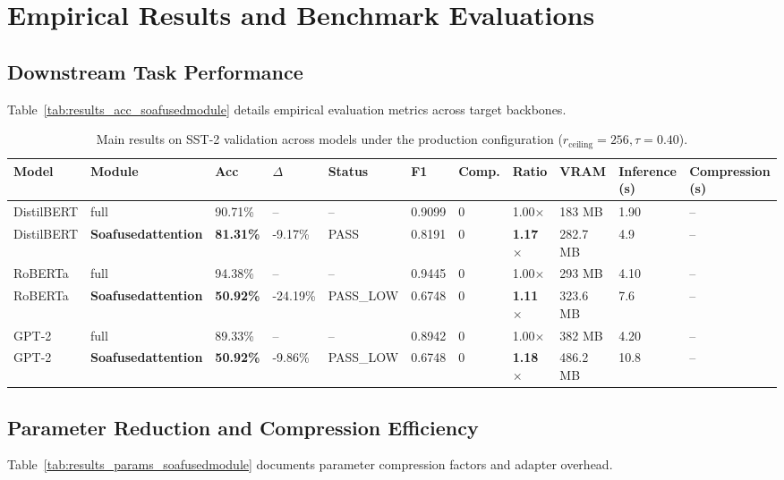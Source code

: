 \section{Empirical Results and Benchmark Evaluations}

\subsection{Downstream Task Performance}
Table~\ref{tab:results_acc_soafusedmodule} details empirical evaluation metrics across target backbones.

\begin{table}[t]
\centering
\small
\begin{tabular}{lllllllllll}
\toprule
\textbf{Model} & \textbf{Module} & \textbf{Acc} & \textbf{$\Delta$} & \textbf{Status} & \textbf{F1} & \textbf{Comp.} & \textbf{Ratio} & \textbf{VRAM} & \textbf{Inference (s)} & \textbf{Compression (s)} \\
\midrule
DistilBERT & full & 90.71\% & -- & -- & 0.9099 & 0 & 1.00$\times$ & 183 MB & 1.90 & -- \\
DistilBERT & \textbf{Soafusedattention} & \textbf{81.31\%} & -9.17\% & PASS & 0.8191 & 0 & \textbf{1.17$\times$} & 282.7 MB & 4.9 & -- \\
RoBERTa & full & 94.38\% & -- & -- & 0.9445 & 0 & 1.00$\times$ & 293 MB & 4.10 & -- \\
RoBERTa & \textbf{Soafusedattention} & \textbf{50.92\%} & -24.19\% & PASS_LOW & 0.6748 & 0 & \textbf{1.11$\times$} & 323.6 MB & 7.6 & -- \\
GPT-2 & full & 89.33\% & -- & -- & 0.8942 & 0 & 1.00$\times$ & 382 MB & 4.20 & -- \\
GPT-2 & \textbf{Soafusedattention} & \textbf{50.92\%} & -9.86\% & PASS_LOW & 0.6748 & 0 & \textbf{1.18$\times$} & 486.2 MB & 10.8 & -- \\
\bottomrule
\end{tabular}
\caption{Main results on SST-2 validation across models under the production configuration ($r_{\mathrm{ceiling}}=256, \tau=0.40$).}
\label{tab:main_sst2}
\end{table}

\subsection{Parameter Reduction and Compression Efficiency}
Table~\ref{tab:results_params_soafusedmodule} documents parameter compression factors and adapter overhead.


